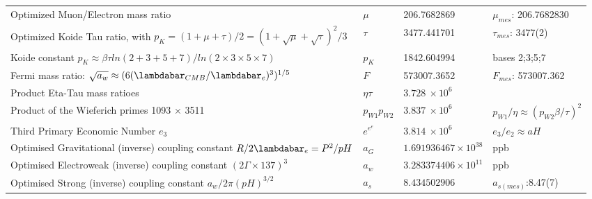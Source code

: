 \documentclass[a4paper,9pt]{article}
\newcounter{row}
\begin{document}
\begin{table}
\begin{tabular}{llll}
    
    Optimized Muon/Electron mass ratio  & $\mu$ & 206.7682869  & $\mu_{mes}$: 206.7682830 \\     
   
  Optimized Koide Tau ratio, with $p_K =(1+\mu+\tau) /2 = (1+\sqrt\mu+\sqrt\tau)^2/3 $ & $\tau$ & 3477.441701  &  $\tau_{mes}$: 3477(2) \\ 
    
   Koide constant $p_K \approx \beta \tau ln(2+3+5+7)/ln(2\times3\times5\times7) $ & $p_K$ & 1842.604994 &  bases 2;3;5;7  \\
   
 Fermi mass ratio: $\sqrt {a_w} \approx (6(\lambdabar_{CMB} /\lambdabar_e)^3)^{1/5}$ \cite{Sanchez2} & $F$   & 573007.3652  & $F_{mes}$: 573007.362 \\

Product Eta-Tau mass ratioes  & $ \eta \tau$ & \underline{$3.728~\times 10^6$}  &  \\ 

Product of the Wieferich primes 1093 $ \times $ 3511  & $p_{W1} p_{W2}$  & \underline{$3.837 ~\times 10^6$}  &  $p_{W1}/\eta \approx (p_{W2} \beta /\tau)^2$\\ 

Third Primary Economic Number $e_3$  & $e^{e^e}$   & \underline{$3.814 ~\times 10^6$} & $e_3/e_2 \approx aH$  \\  

 
 
 
Optimised Gravitational (inverse) coupling constant $R/2\lambdabar_e = P^2/pH$ & $a_G$   & $1.691936467 \times 10^{38}$ & ppb  \cite{Sanchez2}  \\
Optimised Electroweak (inverse) coupling constant $(2\Gamma\times 137)^3$ & $a_w$     & $3.283374406 \times 10^{11}$ & ppb \cite{Sanchez2}  \\
Optimised Strong (inverse) coupling constant $a_w/2\pi(pH)^{3/2}$ & $a_s$   & $8.434502906$ & \cite{Sanchez2} $a_{s(mes)}$:8.47(7) \\
 
 
   
    
         
   \bottomrule
  \end{tabular}
\end{table}
 
\end{document}
